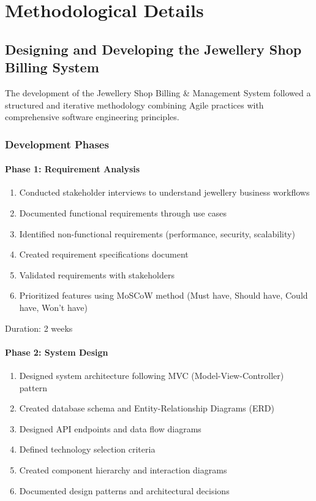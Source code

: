 \documentclass[12pt,a4paper]{report}
\begin{document}
\newpage

\chapter{Methodological Details}

\section{Designing and Developing the Jewellery Shop Billing System}

The development of the Jewellery Shop Billing \& Management System followed a structured and iterative methodology combining Agile practices with comprehensive software engineering principles.

\subsection{Development Phases}

\subsubsection{Phase 1: Requirement Analysis}

\begin{enumerate}[label=\roman*)]
    \item Conducted stakeholder interviews to understand jewellery business workflows
    \item Documented functional requirements through use cases
    \item Identified non-functional requirements (performance, security, scalability)
    \item Created requirement specifications document
    \item Validated requirements with stakeholders
    \item Prioritized features using MoSCoW method (Must have, Should have, Could have, Won't have)
\end{enumerate}

Duration: 2 weeks

\subsubsection{Phase 2: System Design}

\begin{enumerate}[label=\roman*)]
    \item Designed system architecture following MVC (Model-View-Controller) pattern
    \item Created database schema and Entity-Relationship Diagrams (ERD)
    \item Designed API endpoints and data flow diagrams
    \item Defined technology selection criteria
    \item Created component hierarchy and interaction diagrams
    \item Documented design patterns and architectural decisions
\end{enumerate}
\end{document}
